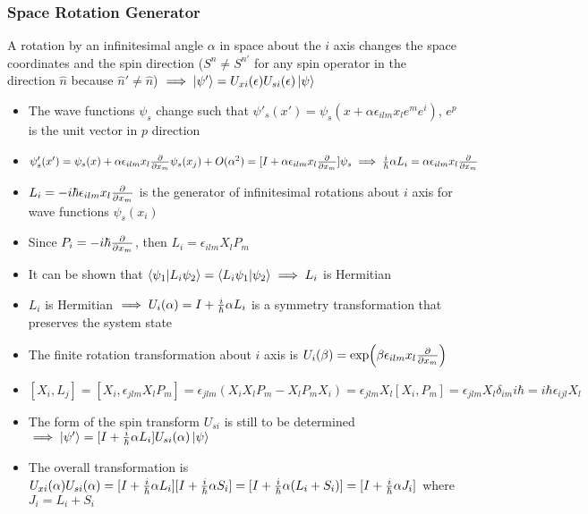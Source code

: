 \documentclass[8pt,t,mathserif,aspectratio=169]{beamer}
\begin{document}
\begin{frame}
  \frametitle{Space Rotation Generator}
  \vspace{1mm}
  A rotation by an infinitesimal angle $\alpha$ in space about the $i$ axis changes the space coordinates and the spin direction ($S^n \neq S^{n'}$ for any spin operator in the direction $\hat{n}$ because $\hat{n}' \neq \hat{n}$) $\implies \ket{\psi'} = U_{xi}(\epsilon) U_{si}(\epsilon) \ket{\psi}$
  \begin{itemize}
    \item The wave functions $\psi_s$ change such that $\psi'_s(x') = \psi_s(x + \alpha \epsilon_{ilm} x_l e^m e^i)$, $e^p$ is the unit vector in $p$ direction
    \item $\psi'_s(x') = \psi_s(x) + \alpha \epsilon_{ilm} x_l {\partial \over \partial x_m} \psi_s(x_j) + O(\alpha^2) = [I + \alpha \epsilon_{ilm} x_l {\partial \over \partial x_m}] \psi_s \implies {i \over \hbar} \alpha L_i = \alpha \epsilon_{ilm} x_l {\partial \over \partial x_m}$
    \item $L_i = -i \hbar \epsilon_{ilm} x_l {\partial \over \partial x_m}$ is the generator of infinitesimal rotations about $i$ axis for wave functions $\psi_s(x_i)$
    \item Since $P_i = -i \hbar {\partial \over \partial x_m}$, then $L_i = \epsilon_{ilm} X_l P_m$
    \item It can be shown that $\bra{\psi_1}\ket{L_i \psi_2} = \bra{L_i \psi_1} \ket{\psi_2} \implies L_i$ is Hermitian 
    \item $L_i$ is Hermitian $\implies U_i(\alpha) = I + {i \over \hbar} \alpha L_i$ is a symmetry transformation that preserves the system state
    \item The finite rotation transformation about $i$ axis is $U_i(\beta) = \exp(\beta \epsilon_{ilm} x_l {\partial \over \partial x_m})$
    \item $[X_i,L_j] = [X_i,\epsilon_{jlm} X_l P_m] = \epsilon_{jlm} (X_i X_l P_m - X_l P_m X_i) = \epsilon_{jlm} X_l [X_i,P_m] = \epsilon_{jlm} X_l \delta_{im} i \hbar = i \hbar \epsilon_{ijl} X_l$
    \item The form of the spin transform $U_{si}$ is still to be determined $\implies \ket{\psi'} = [I + {i \over \hbar} \alpha L_i] U_{si}(\alpha) \ket{\psi}$
    \item The overall transformation is $U_{xi}(\alpha) U_{si}(\alpha) = [I + {i \over \hbar} \alpha L_i] [I + {i \over \hbar} \alpha S_i] = [I + {i \over \hbar} \alpha (L_i + S_i)] = [I + {i \over \hbar} \alpha J_i]$ where $J_i = L_i + S_i$
  \end{itemize}
\end{frame}
\end{document}
